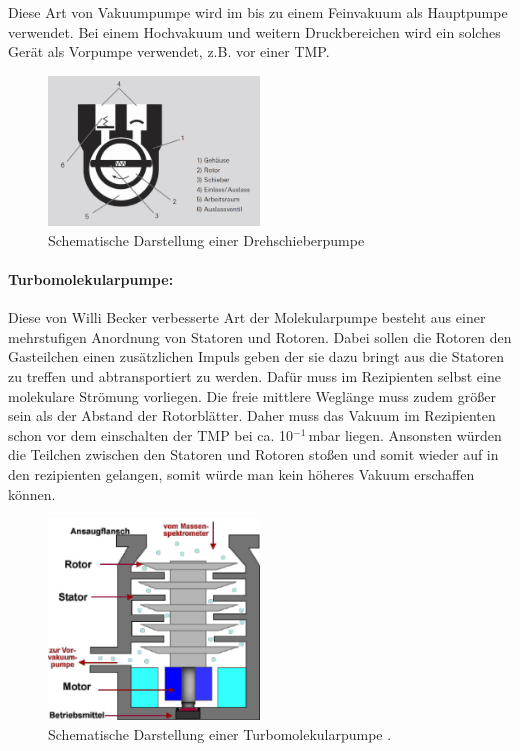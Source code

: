  Diese Art von Vakuumpumpe wird im bis zu einem Feinvakuum als Hauptpumpe verwendet. Bei einem Hochvakuum und weitern Druckbereichen wird
 ein solches Gerät als Vorpumpe verwendet, z.B. vor einer TMP.

 \begin{figure}
   \centering
   \includegraphics[width=0.5\textwidth]{Drehschieberpumpe.png}
   \caption{Schematische Darstellung einer Drehschieberpumpe \cite{DSP}}
   \label{fig:DSP}
 \end{figure}

 \paragraph{Turbomolekularpumpe:}
 Diese von Willi Becker verbesserte Art der Molekularpumpe besteht aus einer mehrstufigen Anordnung von Statoren und Rotoren. Dabei sollen die
 Rotoren den Gasteilchen einen zusätzlichen Impuls geben der sie dazu bringt aus die Statoren zu treffen und abtransportiert zu werden. Dafür
 muss im Rezipienten selbst eine molekulare Strömung vorliegen. Die freie mittlere Weglänge muss zudem größer sein als der Abstand der Rotorblätter.
 Daher muss das Vakuum im Rezipienten schon vor dem einschalten der TMP bei ca. 10$^{-1}\,$mbar liegen. Ansonsten würden die Teilchen zwischen
 den Statoren und Rotoren stoßen und somit wieder auf in den rezipienten gelangen, somit würde man kein höheres Vakuum erschaffen können.
\begin{figure}
  \centering
  \includegraphics[width=0.5\textwidth]{TMP.JPG}
  \caption{Schematische Darstellung einer Turbomolekularpumpe \cite{TMP}.}
  \label{fig:TMP}
\end{figure}
\FloatBarrier

